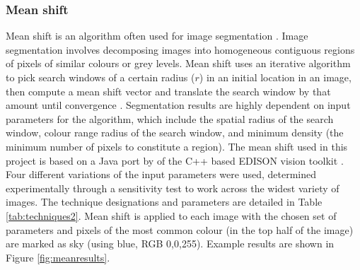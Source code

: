 \documentclass[final,3p,times,authoryear]{elsarticle}
\begin{document}
\subsubsection{Mean shift}\label{sec:mean}

Mean shift is an algorithm often used for image segmentation \citep{Comaniciu1997,Comaniciu2002}. Image segmentation involves decomposing images into homogeneous contiguous regions of pixels of similar colours or grey levels. Mean shift uses an iterative algorithm to pick search windows of a certain radius ($r$) in an initial location in an image, then compute a mean shift vector and translate the search window by that amount until convergence \citep{Comaniciu1997}. Segmentation results are highly dependent on input parameters for the algorithm, which include the spatial radius of the search window, colour range radius of the search window, and minimum density (the minimum number of pixels to constitute a region). The mean shift used in this project is based on a Java port by \cite{Pangburn2002} of the C++ based EDISON vision toolkit \citep{Christoudias2002}. Four different variations of the input parameters were used, determined experimentally through a sensitivity test to work across the widest variety of images. The technique designations and parameters are detailed in Table \ref{tab:techniques2}. Mean shift is applied to each image with the chosen set of parameters and pixels of the most common colour (in the top half of the image) are marked as sky (using blue, RGB 0,0,255). Example results are shown in Figure \ref{fig:meanresults}.
\end{document}
